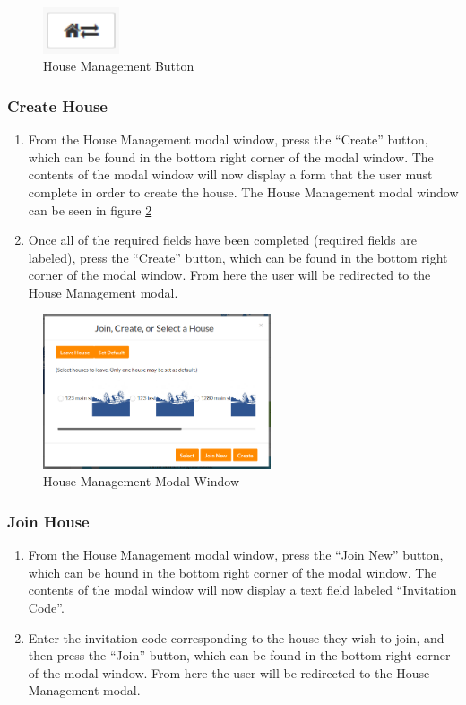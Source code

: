 \documentclass[12pt]{article}
\begin{document}
    \begin{figure}
        \centering
        \includegraphics[width=0.2\textwidth]{house_mgmt_button}
        \caption{House Management Button}
        \label{fig:house_mgmt_button}
    \end{figure}

    \subsubsection{Create House}
    \begin{enumerate}
        \item From the House Management modal window, press the ``Create'' button, which can be found in the bottom right corner of the modal window. The contents of the modal window will now display a form that the user must complete in order to create the house. The House Management modal window can be seen in figure \ref{fig:house_mgmt_modal}
        \item Once all of the required fields have been completed (required fields are labeled), press the ``Create'' button, which can be found in the bottom right corner of the modal window. From here the user will be redirected to the House Management modal.
    \end{enumerate}

    \begin{figure}
        \centering
        \includegraphics[width=0.6\textwidth]{house_mgmt_modal}
        \caption{House Management Modal Window}
        \label{fig:house_mgmt_modal}
    \end{figure}
    
    \subsubsection{Join House}
    \begin{enumerate}
        \item From the House Management modal window, press the ``Join New'' button, which can be hound in the bottom right corner of the modal window. The contents of the modal window will now display a text field labeled ``Invitation Code''.
        \item Enter the invitation code corresponding to the house they wish to join, and then press the ``Join'' button, which can be found in the bottom right corner of the modal window. From here the user will be redirected to the House Management modal.
    \end{enumerate}
\end{document}
